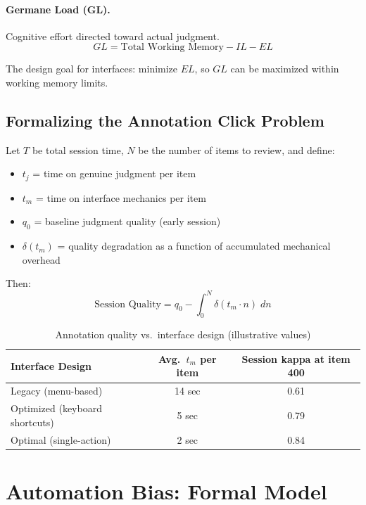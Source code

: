 \paragraph{Germane Load (GL).} Cognitive effort directed toward actual judgment.
\[
GL = \text{Total Working Memory} - IL - EL
\]

The design goal for \hitl interfaces: minimize $EL$, so $GL$ can be maximized within working memory limits.

\subsection{Formalizing the Annotation Click Problem}

Let $T$ be total session time, $N$ be the number of items to review, and define:
\begin{itemize}
    \item $t_j$ = time on genuine judgment per item
    \item $t_m$ = time on interface mechanics per item
    \item $q_0$ = baseline judgment quality (early session)
    \item $\delta(t_m)$ = quality degradation as a function of accumulated mechanical overhead
\end{itemize}

Then:
\[
\text{Session Quality} = q_0 - \int_0^N \delta(t_m \cdot n)\; dn
\]

\begin{table}[htbp]
\caption{Annotation quality vs.\ interface design (illustrative values)}
\label{tab:annotation-interface}
\centering
\small
\begin{tabularx}{\textwidth}{@{}Ycc@{}}
\toprule
\textbf{Interface Design} & \textbf{Avg.\ $t_m$ per item} & \textbf{Session kappa at item 400} \\
\midrule
Legacy (menu-based)         & 14 sec & 0.61 \\
Optimized (keyboard shortcuts) & 5 sec & 0.79 \\
Optimal (single-action)     & 2 sec  & 0.84 \\
\bottomrule
\end{tabularx}
\end{table}

\section{Automation Bias: Formal Model}

